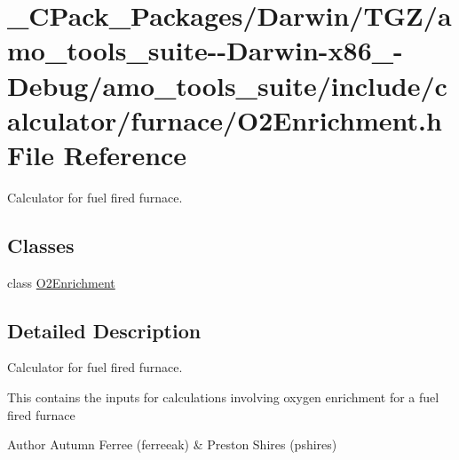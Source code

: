 \hypertarget{___c_pack___packages_2_darwin_2_t_g_z_2amo__tools__suite--_darwin-x86__64-_debug_2amo__tools__su6381baebc04ea8a8646cbb8a26367db7}{}\section{\+\_\+\+C\+Pack\+\_\+\+Packages/\+Darwin/\+T\+G\+Z/amo\+\_\+tools\+\_\+suite-\/-\/\+Darwin-\/x86\+\_-\/\+Debug/amo\+\_\+tools\+\_\+suite/include/calculator/furnace/\+O2\+Enrichment.h File Reference}
\label{___c_pack___packages_2_darwin_2_t_g_z_2amo__tools__suite--_darwin-x86__64-_debug_2amo__tools__su6381baebc04ea8a8646cbb8a26367db7}


Calculator for fuel fired furnace.  


\subsection*{Classes}
\begin{DoxyCompactItemize}
\item 
class \hyperlink{class_o2_enrichment}{O2\+Enrichment}
\end{DoxyCompactItemize}


\subsection{Detailed Description}
Calculator for fuel fired furnace. 

This contains the inputs for calculations involving oxygen enrichment for a fuel fired furnace

\begin{DoxyAuthor}{Author}
Autumn Ferree (ferreeak) \& Preston Shires (pshires) 
\end{DoxyAuthor}
